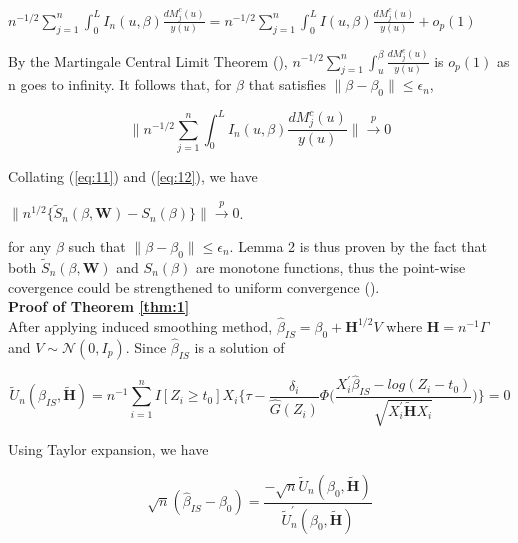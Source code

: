 \documentclass[titlepage,english,12pt]{article}
\begin{document}
	\begin{center}
	$n^{-1/2}\sum_{j=1}^{n} \int_{0}^{L}I_n(u,\beta)\frac{dM_j^c(u)}{y(u)}=n^{-1/2}\sum_{j=1}^{n}\int_{0}^{L}I(u,\beta)\frac{dM_j^c(u)}{y(u)}+o_p(1)$
	\end{center}
	
	\noindent By the Martingale Central Limit Theorem (\citet{fleming2011counting}), $n^{-1/2}\sum_{j=1}^{n}\int_{u}^{\beta}\frac{dM_j^c(u)}{y(u)}$ is $o_p(1)$ as n goes to infinity. It follows that, for $\beta$ that satisfies $\lVert \beta - \beta_0 \rVert \leq \epsilon_n$,
	
	\begin{equation} \label{eq:12}
	\Bigg\lVert n^{-1/2} \sum_{j=1}^{n} \int_{0}^{L} I_n(u,\beta)\frac{dM_j^c(u)}{y(u)} \Bigg\rVert \xrightarrow{p} 0
	\end{equation}
	
	\noindent Collating (\ref{eq:11}) and (\ref{eq:12}), we have
	\begin{center}
	$\lVert {n^{1/2}} \{ \tilde{S}_n(\beta, \textbf{W})-S_n(\beta) \} \rVert \xrightarrow{p} 0$.
	\end{center}
	
	\noindent for any $\beta$ such that $\lVert \beta - \beta_0 \rVert \leq \epsilon_n$. Lemma 2 is thus proven by the fact that both $\tilde{S}_n(\beta, \textbf{W})$ and $S_n(\beta)$ are monotone functions, thus the point-wise covergence could be strengthened to uniform convergence (\citet{shorack2009empirical}).\\
	
	\noindent \textbf{Proof of Theorem \ref{thm:1}}\\
	After applying induced smoothing method, $\hat{\beta}_{IS} = \beta_0+\textbf{H}^{1/2}V$ where $\textbf{H}=n^{-1}\Gamma$ and $V \sim\mathcal{N}(0,I_p)$.
	Since $\hat{\beta}_{IS}$ is a solution of
	
	\begin{equation} \label{eq:13}
	\tilde{U}_n(\hat{\beta}_{IS}, \tilde{\textbf{H}})= n^{-1} \sum_{i=1}^{n} I[Z_i \geq t_0] X_i \Bigg\{\tau -  \frac{\delta_i}{\hat{G}(Z_i)}\Phi\Bigg(\frac{X_i^\prime\hat{\beta}_{IS}-log(Z_i-t_0)}{\sqrt{X_i^{\prime} \tilde{\textbf{H}}X_{i}}}\Bigg) \Bigg\}=0
	\end{equation}
	
	\noindent Using Taylor expansion, we have
	
	\begin{equation} \label{eq:14}
	\sqrt{n}(\hat{\beta}_{IS}-\beta_0) = \frac{-\sqrt{n}\tilde{U}_n(\beta_0, \tilde{\textbf{H}})}{\tilde{U}_n^{\prime}(\beta_0,\tilde{\textbf{H}})}
	\end{equation}
	
\end{document}
